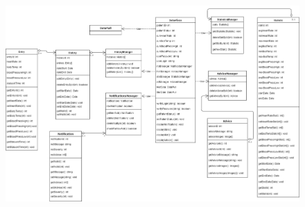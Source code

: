 \begin{center}
\begin{figure}[h]
	\includegraphics[width=15cm, height=10cm]{UserInterface/Interface.png}
\end{figure}
\end{center}

